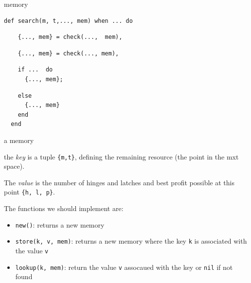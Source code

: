 \begin{frame}[fragile]{memory}

\begin{verbatim}
def search(m, t,..., mem) when ... do 
\end{verbatim}
\pause
\begin{verbatim}
    {..., mem} = check(...,  mem), 
\end{verbatim}
\pause
\begin{verbatim}
    {..., mem} = check(..., mem), 
\end{verbatim}
\pause
\begin{verbatim}
    if ...  do
      {..., mem};
\end{verbatim}
\pause
\begin{verbatim}
    else 
      {..., mem}
    end
  end
\end{verbatim}

\end{frame}

\begin{frame}[fragile]{a memory}

\vspace{10pt}\pause

the {\em key} is a tuple \texttt{\{m,t\}}, defining the remaining resource (the point in the mxt space).

\vspace{10pt}\pause

The {\em value} is the number of hinges and latches and best profit possible at this point \texttt{\{h, l, p\}}.

\vspace{10pt}\pause

The functions we should implement are: \pause

\begin{itemize}

  \item \texttt{new()}: returns a new memory \pause

  \item \texttt{store(k, v, mem)}: returns a new memory where the key
  \texttt{k} is associated with the value \texttt{v} \pause

  \item \texttt{lookup(k, mem)}: return the value \texttt{v} assocaued with
  the key or \texttt{nil} if not found
\end{itemize}

\end{frame}


